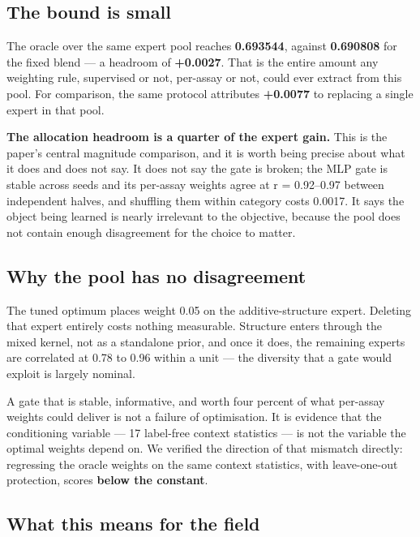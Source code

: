 \documentclass{article}
\begin{document}
\subsection{The bound is small}\label{the-bound-is-small}

The oracle over the same expert pool reaches \textbf{0.693544}, against \textbf{0.690808} for the fixed blend --- a
headroom of \textbf{+0.0027}. That is the entire amount any weighting rule, supervised or not, per-assay or
not, could ever extract from this pool. For comparison, the same protocol attributes \textbf{+0.0077} to
replacing a single expert in that pool.

\textbf{The allocation headroom is a quarter of the expert gain.} This is the paper's central magnitude
comparison, and it is worth being precise about what it does and does not say. It does not say the gate
is broken; the MLP gate is stable across seeds and its per-assay weights agree at r = 0.92--0.97 between
independent halves, and shuffling them within category costs 0.0017. It says the object being learned
is nearly irrelevant to the objective, because the pool does not contain enough disagreement for the
choice to matter.

\subsection{Why the pool has no disagreement}\label{why-the-pool-has-no-disagreement}

The tuned optimum places weight 0.05 on the additive-structure expert. Deleting that expert entirely
costs nothing measurable. Structure enters through the mixed kernel, not as a standalone prior, and once
it does, the remaining experts are correlated at 0.78 to 0.96 within a unit --- the diversity that a gate
would exploit is largely nominal.

A gate that is stable, informative, and worth four percent of what per-assay weights could deliver is
not a failure of optimisation. It is evidence that the conditioning variable --- 17 label-free context
statistics --- is not the variable the optimal weights depend on. We verified the direction of that
mismatch directly: regressing the oracle weights on the same context statistics, with leave-one-out
protection, scores \textbf{below the constant}.

\subsection{What this means for the field}\label{what-this-means-for-the-field}
\end{document}
